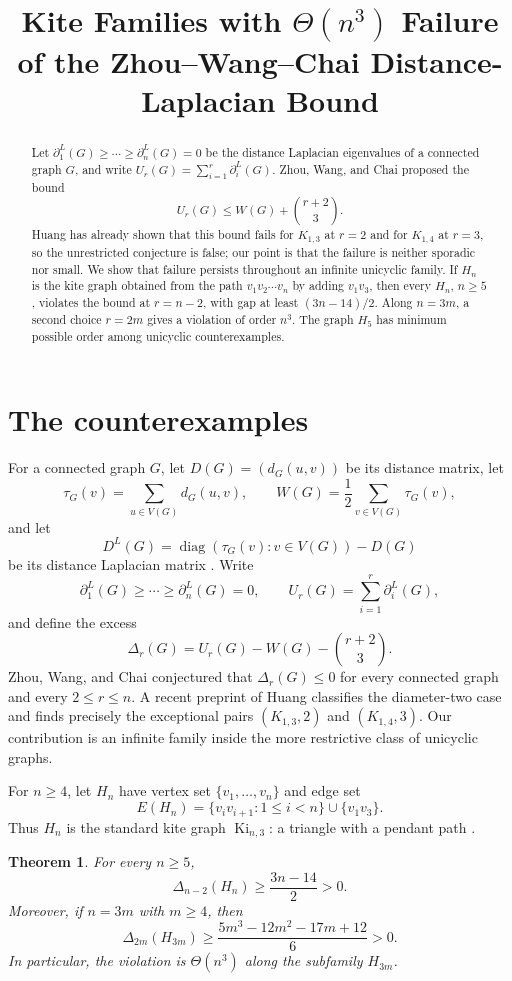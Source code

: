 \documentclass[11pt]{amsart}
\title[Cubic failure of the Zhou--Wang--Chai bound]{Kite Families with $\Theta(n^3)$ Failure of the Zhou--Wang--Chai Distance-Laplacian Bound}
\date{}
\newtheorem{theorem}{Theorem}
\theoremstyle{remark}
\newcommand{\DL}{D^{L}}
\newcommand{\gap}{\Delta}
\begin{document}
\begin{abstract}
Let $\partial_1^L(G)\ge\cdots\ge\partial_n^L(G)=0$ be the distance Laplacian eigenvalues of a connected graph $G$, and write
$U_r(G)=\sum_{i=1}^r\partial_i^L(G)$.
Zhou, Wang, and Chai proposed the bound
\[
U_r(G)\le W(G)+\binom{r+2}{3}.
\]
Huang \cite{Huang} has already shown that this bound fails for $K_{1,3}$ at $r=2$ and for $K_{1,4}$ at $r=3$, so the unrestricted conjecture is false; our point is that the failure is neither sporadic nor small. We show that failure persists throughout an infinite unicyclic family. If $H_n$ is the kite graph obtained from the path $v_1v_2\cdots v_n$ by adding $v_1v_3$, then every $H_n$, $n\ge5$, violates the bound at $r=n-2$, with gap at least $(3n-14)/2$. Along $n=3m$, a second choice $r=2m$ gives a violation of order $n^3$. The graph $H_5$ has minimum possible order among unicyclic counterexamples.
\end{abstract}

\maketitle

\section{The counterexamples}

For a connected graph $G$, let $D(G)=(d_G(u,v))$ be its distance matrix, let
\[
\tau_G(v)=\sum_{u\in V(G)}d_G(u,v),
\qquad
W(G)=\frac12\sum_{v\in V(G)}\tau_G(v),
\]
and let
\[
\DL(G)=\operatorname{diag}(\tau_G(v):v\in V(G))-D(G)
\]
be its distance Laplacian matrix \cite{AouchicheHansen}.
Write
\[
\partial_1^L(G)\ge\cdots\ge\partial_n^L(G)=0,
\qquad
U_r(G)=\sum_{i=1}^r\partial_i^L(G),
\]
and define the excess
\[
\gap_r(G)=U_r(G)-W(G)-\binom{r+2}{3}.
\]
Zhou, Wang, and Chai \cite{ZhouWangChai} conjectured that $\gap_r(G)\le0$ for every connected graph and every $2\le r\le n$. A recent preprint of Huang \cite{Huang} classifies the diameter-two case and finds precisely the exceptional pairs $(K_{1,3},2)$ and $(K_{1,4},3)$. Our contribution is an infinite family inside the more restrictive class of unicyclic graphs.

For $n\ge4$, let $H_n$ have vertex set $\{v_1,\ldots,v_n\}$ and edge set
\[
E(H_n)=\{v_iv_{i+1}:1\le i<n\}\cup\{v_1v_3\}.
\]
Thus $H_n$ is the standard kite graph $\operatorname{Ki}_{n,3}$: a triangle with a pendant path \cite{LinDuZhou}.

\begin{theorem}\label{thm:main}
For every $n\ge5$,
\[
\gap_{n-2}(H_n)\ge\frac{3n-14}{2}>0.
\]
Moreover, if $n=3m$ with $m\ge4$, then
\[
\gap_{2m}(H_{3m})
\ge
\frac{5m^3-12m^2-17m+12}{6}>0.
\]
In particular, the violation is $\Theta(n^3)$ along the subfamily $H_{3m}$.
\end{theorem}
\end{document}
